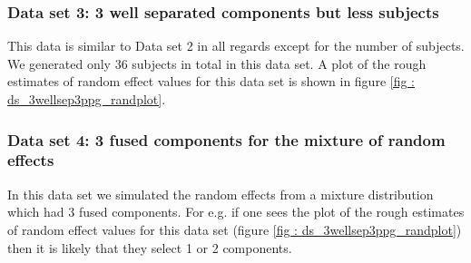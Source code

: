 \subsubsection{Data set 3: 3 well separated components but less subjects}
\label{subsubsec : ds_3wellsep_3ppg}
This data is similar to Data set 2 in all regards except for the number of subjects. We generated only 36 subjects in total in this data set. A plot of the rough estimates of random effect values for this data set is shown in figure \ref{fig : ds_3wellsep3ppg_randplot}.

\subsubsection{Data set 4: 3 fused components for the mixture of random effects}
\label{subsubsec : ds_3fused_10ppg}
In this data set we simulated the random effects from a mixture distribution which had 3 fused components. For e.g. if one sees the plot of the rough estimates of random effect values for this data set (figure \ref{fig : ds_3wellsep3ppg_randplot}) then it is likely that they select 1 or 2 components.

